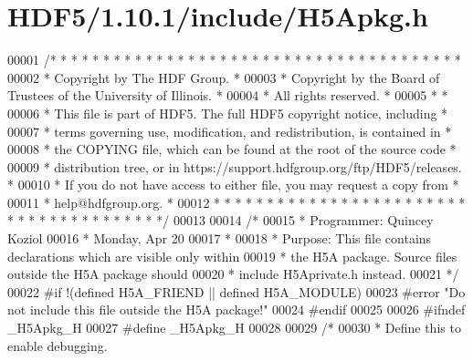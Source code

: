 \hypertarget{_h_d_f5_21_810_81_2include_2_h5_apkg_8h_source}{}\section{H\+D\+F5/1.10.1/include/\+H5\+Apkg.h}
\label{_h_d_f5_21_810_81_2include_2_h5_apkg_8h_source}

\begin{DoxyCode}
00001 \textcolor{comment}{/* * * * * * * * * * * * * * * * * * * * * * * * * * * * * * * * * * * * * * *}
00002 \textcolor{comment}{ * Copyright by The HDF Group.                                               *}
00003 \textcolor{comment}{ * Copyright by the Board of Trustees of the University of Illinois.         *}
00004 \textcolor{comment}{ * All rights reserved.                                                      *}
00005 \textcolor{comment}{ *                                                                           *}
00006 \textcolor{comment}{ * This file is part of HDF5.  The full HDF5 copyright notice, including     *}
00007 \textcolor{comment}{ * terms governing use, modification, and redistribution, is contained in    *}
00008 \textcolor{comment}{ * the COPYING file, which can be found at the root of the source code       *}
00009 \textcolor{comment}{ * distribution tree, or in https://support.hdfgroup.org/ftp/HDF5/releases.  *}
00010 \textcolor{comment}{ * If you do not have access to either file, you may request a copy from     *}
00011 \textcolor{comment}{ * help@hdfgroup.org.                                                        *}
00012 \textcolor{comment}{ * * * * * * * * * * * * * * * * * * * * * * * * * * * * * * * * * * * * * * */}
00013 
00014 \textcolor{comment}{/*}
00015 \textcolor{comment}{ * Programmer:  Quincey Koziol}
00016 \textcolor{comment}{ *              Monday, Apr 20}
00017 \textcolor{comment}{ *}
00018 \textcolor{comment}{ * Purpose:     This file contains declarations which are visible only within}
00019 \textcolor{comment}{ *              the H5A package.  Source files outside the H5A package should}
00020 \textcolor{comment}{ *              include H5Aprivate.h instead.}
00021 \textcolor{comment}{ */}
00022 \textcolor{preprocessor}{#if !(defined H5A\_FRIEND || defined H5A\_MODULE)}
00023 \textcolor{preprocessor}{#error "Do not include this file outside the H5A package!"}
00024 \textcolor{preprocessor}{#endif}
00025 
00026 \textcolor{preprocessor}{#ifndef \_H5Apkg\_H}
00027 \textcolor{preprocessor}{#define \_H5Apkg\_H}
00028 
00029 \textcolor{comment}{/*}
00030 \textcolor{comment}{ * Define this to enable debugging.}

\end{DoxyCode}
